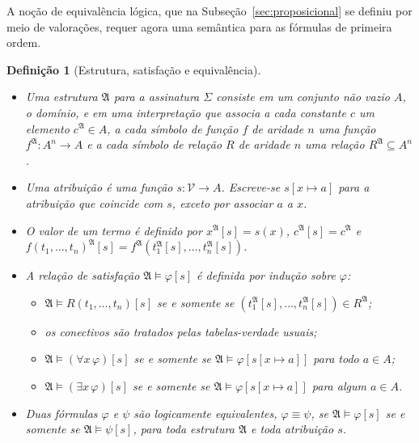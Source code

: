 \documentclass[12pt,a4paper,oneside]{report}
\theoremstyle{tituloplain}
\theoremstyle{titulodef}
\newtheorem{definicao}[teorema]{Definição}
\begin{document}
A noção de equivalência lógica, que na Subseção~\ref{sec:proposicional} se definiu por meio de valorações, requer agora uma semântica para as fórmulas de primeira ordem.

\begin{definicao}[Estrutura, satisfação e equivalência]\label{def:semantica-fo}
\leavevmode\vspace{-0.6\baselineskip}
\begin{itemize}
  \item Uma \emph{estrutura} $\mathfrak{A}$ para a assinatura $\Sigma$ consiste em um conjunto não vazio $A$, o \emph{domínio}, e em uma interpretação que associa a cada constante $c$ um elemento $c^{\mathfrak{A}}\in A$, a cada símbolo de função $f$ de aridade $n$ uma função $f^{\mathfrak{A}}\colon A^n\to A$ e a cada símbolo de relação $R$ de aridade $n$ uma relação $R^{\mathfrak{A}}\subseteq A^n$.
  \item Uma \emph{atribuição} é uma função $s\colon\mathcal{V}\to A$. Escreve-se $s[x\mapsto a]$ para a atribuição que coincide com $s$, exceto por associar $a$ a $x$.
  \item O \emph{valor} de um termo é definido por $x^{\mathfrak{A}}[s]=s(x)$, $c^{\mathfrak{A}}[s]=c^{\mathfrak{A}}$ e $f(t_1,\dots,t_n)^{\mathfrak{A}}[s]=f^{\mathfrak{A}}(t_1^{\mathfrak{A}}[s],\dots,t_n^{\mathfrak{A}}[s])$.
  \item A relação de \emph{satisfação} $\mathfrak{A}\models\varphi[s]$ é definida por indução sobre $\varphi$:
  \begin{itemize}
    \item $\mathfrak{A}\models R(t_1,\dots,t_n)[s]$ se e somente se $(t_1^{\mathfrak{A}}[s],\dots,t_n^{\mathfrak{A}}[s])\in R^{\mathfrak{A}}$;
    \item os conectivos são tratados pelas tabelas-verdade usuais;
    \item $\mathfrak{A}\models(\forall x\,\varphi)[s]$ se e somente se $\mathfrak{A}\models\varphi[s[x\mapsto a]]$ para todo $a\in A$;
    \item $\mathfrak{A}\models(\exists x\,\varphi)[s]$ se e somente se $\mathfrak{A}\models\varphi[s[x\mapsto a]]$ para algum $a\in A$.
  \end{itemize}
  \item Duas fórmulas $\varphi$ e $\psi$ são \emph{logicamente equivalentes}, $\varphi\equiv\psi$, se $\mathfrak{A}\models\varphi[s]$ se e somente se $\mathfrak{A}\models\psi[s]$, para toda estrutura $\mathfrak{A}$ e toda atribuição $s$.
\end{itemize}
\end{definicao}
\end{document}
